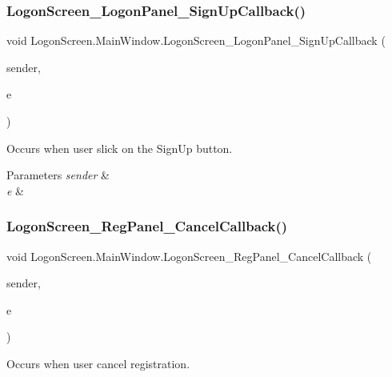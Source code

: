 \subsubsection{\texorpdfstring{Logon\+Screen\+\_\+\+Logon\+Panel\+\_\+\+Sign\+Up\+Callback()}{LogonScreen\_LogonPanel\_SignUpCallback()}}
{\footnotesize\ttfamily void Logon\+Screen.\+Main\+Window.\+Logon\+Screen\+\_\+\+Logon\+Panel\+\_\+\+Sign\+Up\+Callback (\begin{DoxyParamCaption}\item[{object}]{sender,  }\item[{Routed\+Event\+Args}]{e }\end{DoxyParamCaption})\hspace{0.3cm}{\ttfamily [private]}}



Occurs when user slick on the Sign\+Up button. 


\begin{DoxyParams}{Parameters}
{\em sender} & \\
\hline
{\em e} & \\
\hline
\end{DoxyParams}
\mbox{\label{class_logon_screen_1_1_main_window_ae04ea4e75e12e393191de155664f5292}} 
\subsubsection{\texorpdfstring{Logon\+Screen\+\_\+\+Reg\+Panel\+\_\+\+Cancel\+Callback()}{LogonScreen\_RegPanel\_CancelCallback()}}
{\footnotesize\ttfamily void Logon\+Screen.\+Main\+Window.\+Logon\+Screen\+\_\+\+Reg\+Panel\+\_\+\+Cancel\+Callback (\begin{DoxyParamCaption}\item[{object}]{sender,  }\item[{Routed\+Event\+Args}]{e }\end{DoxyParamCaption})\hspace{0.3cm}{\ttfamily [private]}}



Occurs when user cancel registration. 


